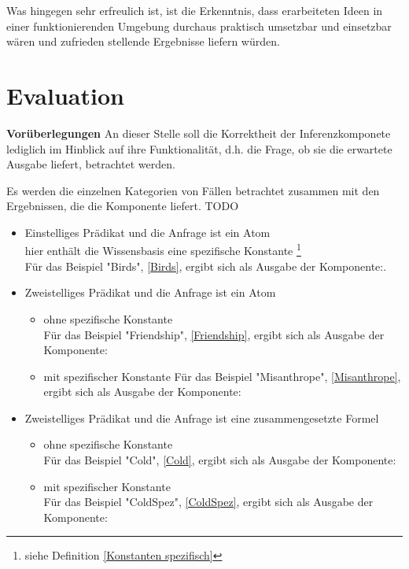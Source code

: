 \documentclass[a4paper, 11pt]{book}
\begin{document}
{Was hingegen sehr erfreulich ist, ist die Erkenntnis, dass erarbeiteten Ideen in einer funktionierenden Umgebung durchaus praktisch umsetzbar und einsetzbar wären und zufrieden stellende Ergebnisse liefern würden.


\chapter{Evaluation}\label{eval} 
\textbf{Vorüberlegungen}
An dieser Stelle soll die Korrektheit der Inferenzkomponete lediglich im Hinblick auf ihre Funktionalität, d.h. die Frage, ob sie die erwartete Ausgabe liefert, betrachtet werden. 

Es werden die einzelnen Kategorien von Fällen betrachtet zusammen mit den Ergebnissen, die die Komponente liefert. 
TODO
\begin{itemize}
	\item Einstelliges Prädikat und die Anfrage ist ein Atom\\
	hier enthält die Wissensbasis eine spezifische Konstante \footnote{siehe Definition \ref{Konstanten spezifisch}}\\
	Für das Beispiel "{}Birds"{}, \ref{Birds}, ergibt sich als Ausgabe der Komponente:.
	
	\item Zweistelliges Prädikat und die Anfrage ist ein Atom
	\begin{itemize}
		\item ohne spezifische Konstante\\
			Für das Beispiel "{}Friendship"{}, \ref{Friendship}, ergibt sich als Ausgabe der Komponente:
				
		\item mit spezifischer Konstante
			Für das Beispiel "{}Misanthrope"{}, \ref{Misanthrope}, ergibt sich als Ausgabe der Komponente:
				
	\end{itemize}
	\item Zweistelliges Prädikat und die Anfrage ist eine zusammengesetzte Formel
\begin{itemize}
	\item ohne spezifische Konstante\\
		Für das Beispiel "{}Cold"{}, \ref{Cold}, ergibt sich als Ausgabe der Komponente:
			
	\item mit spezifischer Konstante\\
		Für das Beispiel "{}ColdSpez"{}, \ref{ColdSpez}, ergibt sich als Ausgabe der Komponente:
\end{itemize}


\end{itemize}}
\end{document}
